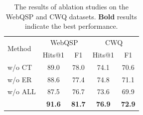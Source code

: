 \begin{table}[t]
\centering
\small
\begin{tabular}{l|cc|cc}
\toprule
\multirow{2}{*}{Method} & \multicolumn{2}{c}{WebQSP} & \multicolumn{2}{c}{CWQ} \\
 & Hits@1 & F1 & Hits@1 & F1 \\
\midrule
\method{} w/o CT & 89.0 & 78.0 & 74.1 & 70.6\\

\method{} w/o ER & 88.6 & 77.4 & 74.8 & 71.1 \\

\method{} w/o ALL & 87.5 & 76.7 & 73.6 & 69.9 \\
\midrule
\method{} &  \textbf{91.6} & \textbf{81.7} & \textbf{76.9} & \textbf{72.9} \\
\bottomrule
\end{tabular}
\caption{The results of ablation studies on the WebQSP and CWQ datasets. \textbf{Bold} results indicate the best performance.}

\label{tab:ablation_results}
\end{table}
